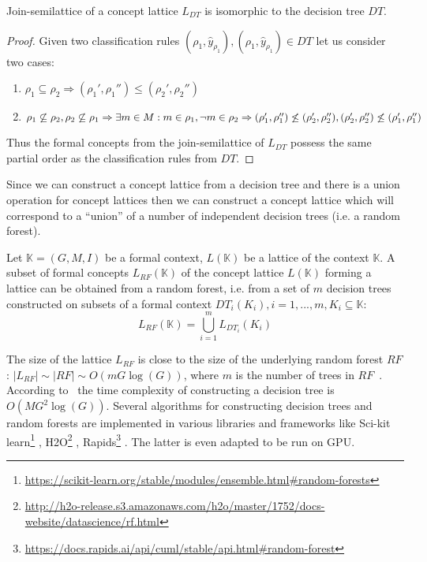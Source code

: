 \documentclass[runningheads]{llncs}
\begin{document}
\begin{proposition}
\label{prop:dt_semlattice}
Join-semilattice of a concept lattice $L_{DT}$ is isomorphic to the decision tree $DT$.
\end{proposition}
\begin{proof}
Given two classification rules $(\rho_1, \hat{y}_{\rho_1}),(\rho_1, \hat{y}_{\rho_1}) \in DT$ let us consider two cases:
\begin{enumerate}
    \item $\rho_1 \subseteq \rho_2 \Rightarrow (\rho_1', \rho_1'') \leq (\rho_2', \rho_2'')$
    \item $\rho_1 \not \subseteq \rho_2, \rho_2 \not \subseteq \rho_1 \Rightarrow \exists m \in M: m \in \rho_1, \neg m \in \rho_2 \\ \Rightarrow (\rho_1', \rho_1'') \not \leq (\rho_2', \rho_2''), (\rho_2', \rho_2'') \not \leq (\rho_1', \rho_1'')$
\end{enumerate}

Thus the formal concepts from the join-semilattice of $L_{DT}$ possess the same partial order as the classification rules from $DT$.
\end{proof}

Since we can construct a concept lattice from a decision tree and there is a union operation for concept lattices then we can construct a concept lattice which will correspond to a ``union'' of a number of independent decision trees (i.e. a random forest). 

\begin{proposition}
\label{prop:lattice_by_rf}
Let $\mathbb{K}=(G,M,I)$ be a formal context, $L(\mathbb{K})$ be a lattice of the context $\mathbb{K}$. A subset of formal concepts $L_{RF}(\mathbb{K})$ of the concept lattice $L(\mathbb{K})$
forming a lattice can be obtained from a random forest, i.e. from a set of $m$ decision trees constructed on subsets of a formal context $DT_i(K_i), i=1,...,m, K_i \subseteq \mathbb{K}$:
\begin{equation}
    L_{RF}(\mathbb{K}) = \bigcup_{i=1}^m L_{DT_i}(K_i)
\end{equation}
\end{proposition}

The size of the lattice $L_{RF}$ is close to the size of the underlying random forest $RF$:  $|L_{RF}| \sim |RF| \sim O(mG\log(G))$, where $m$ is the number of trees in $RF$~\cite{SklearnRF}.
According to~\cite{SklearnDT} the time complexity of  constructing a decision tree is $O(MG^2\log(G))$. Several algorithms for constructing decision trees and random forests are implemented in various libraries and frameworks like Sci-kit learn\footnote{\url{https://scikit-learn.org/stable/modules/ensemble.html\#random-forests}}
, H2O\footnote{\url{http://h2o-release.s3.amazonaws.com/h2o/master/1752/docs-website/datascience/rf.html}}
, Rapids\footnote{\url{https://docs.rapids.ai/api/cuml/stable/api.html\#random-forest}}
. The latter is even adapted to be run on GPU.
\end{document}
